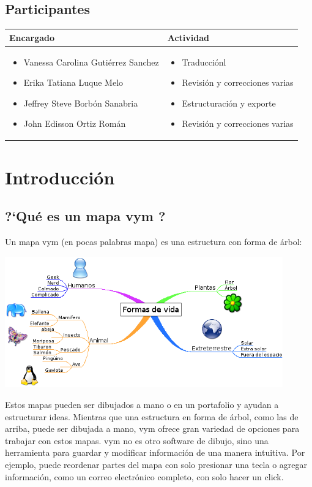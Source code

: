 \documentclass{article}
\newcommand{\vym}{{\sc vym }}
\begin{document}
\subsection{Participantes}
\begin{center}
\begin{tabular}{|p{7cm}|p{5.5cm}|} \hline
    Encargado & Actividad \\ \hline
    \begin{itemize}
       \item Vanessa Carolina Guti\'errez Sanchez
       \item Erika Tatiana Luque Melo
       \item Jeffrey Steve Borb\'on Sanabria
       \item John Edisson Ortiz Rom\'an
    \end{itemize} &
    \begin{itemize}
        \item Traducci\'onl
        \item Revisi\'on y correcciones varias
        \item Estructuraci\'on y exporte
        \item Revisi\'on y correcciones varias
    \end{itemize}     \\ \hline
\end{tabular}   
\end{center}

\section{Introducci\'on}
\subsection{?`Qu\'e es un mapa \vym?}
Un mapa \vym (en pocas palabras mapa) es una estructura con forma de \'arbol:
\begin{center}
    \includegraphics[width=12cm]{images/example1_es.png}
\end{center}
Estos mapas pueden ser dibujados a mano o en un portafolio y ayudan a estructurar ideas. Mientras que una estructura en forma de \'arbol, como las de arriba, puede ser dibujada a mano, \vym ofrece gran variedad de opciones para trabajar con estos mapas. \vym no es otro software de dibujo, sino una herramienta para guardar y modificar informaci\'on de una manera intuitiva. Por ejemplo, puede reordenar partes del mapa con solo presionar una tecla o agregar informaci\'on, como un correo electr\'onico completo, con solo hacer un click.
\end{document}
